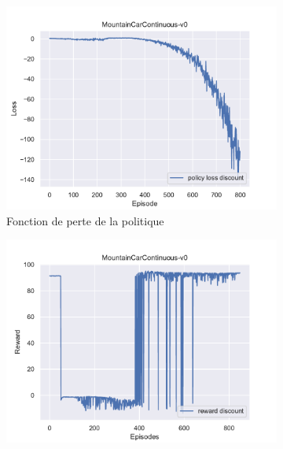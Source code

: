 \begin{figure}[H]
    \centering
    \begin{subfigure}{0.45\textwidth}
        \includegraphics[width=\textwidth]{figures/mountain_car/policy_loss_MountainCarContinuous-v0_pg_dataset_td_trajs_800_update_threshold_1000_nb_updates_20_gamma_0.98_tau_0.01_nstep_5_lr_act_0.0005_lr_critic_0.001_init_alpha_0.02_lr_alpha_0.0_target_entropy_alpha_-1.0pg.pdf}
        \caption{Fonction de perte de la politique}\label{fig:mountain:policy_loss}
    \end{subfigure}
    \begin{subfigure}{0.45\textwidth}
        \includegraphics[width=\textwidth]{figures/mountain_car/rewards_MountainCarContinuous-v0_pg_dataset_td_trajs_800_update_threshold_1000_nb_updates_20_gamma_0.98_tau_0.01_nstep_5_lr_act_0.0005_lr_critic_0.001_init_alpha_0.02_lr_alpha_0.0_target_entropy_alpha_-1.0.pdf}

\end{subfigure}
\end{figure}
